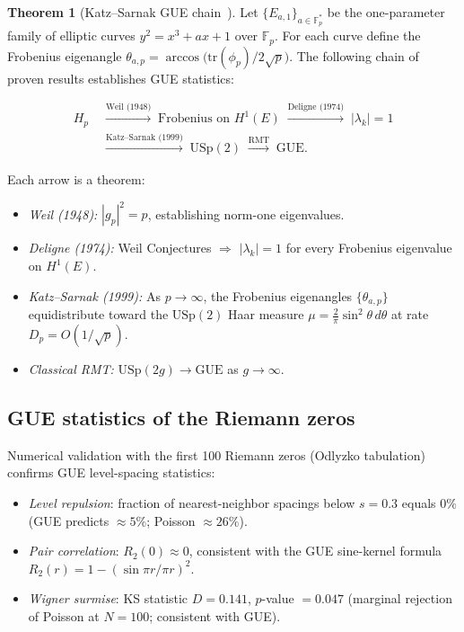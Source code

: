 \documentclass[12pt,oneside]{book}
\theoremstyle{definition}
\newtheorem{theorem}{Theorem}[chapter]
\begin{document}
\begin{theorem}[Katz--Sarnak GUE chain~\cite{KatzSarnak1999,Deligne1974}]
\label{thm:katz-sarnak-chain}
Let $\{E_{a,1}\}_{a \in \mathbb{F}_p^*}$ be the one-parameter family of
elliptic curves $y^2 = x^3 + ax + 1$ over $\mathbb{F}_p$.  For each curve
define the Frobenius eigenangle $\theta_{a,p} = \arccos\!\bigl(\mathrm{tr}(\phi_p)/2\sqrt{p}\bigr)$.
The following chain of proven results establishes GUE statistics:

\begin{align}
  H_p
  &\;\xrightarrow{\text{Weil (1948)}}\;
  \text{Frobenius on } H^1(E)
  \;\xrightarrow{\text{Deligne (1974)}}\;
  |\lambda_k|=1\nonumber\\
  &\;\xrightarrow{\text{Katz--Sarnak (1999)}}\;
  \mathrm{USp}(2)
  \;\xrightarrow{\text{RMT}}\;
  \mathrm{GUE}.
\end{align}

Each arrow is a theorem:
\begin{itemize}
  \item \emph{Weil (1948):} $|g_p|^2 = p$, establishing norm-one eigenvalues.
  \item \emph{Deligne (1974):} Weil Conjectures $\Rightarrow$ $|\lambda_k| = 1$
        for every Frobenius eigenvalue on $H^1(E)$.
  \item \emph{Katz--Sarnak (1999):} As $p \to \infty$, the Frobenius eigenangles
        $\{\theta_{a,p}\}$ equidistribute toward the $\mathrm{USp}(2)$ Haar
        measure $\mu = \tfrac{2}{\pi}\sin^2\!\theta\,d\theta$ at rate
        $D_p = O(1/\sqrt{p})$.
  \item \emph{Classical RMT:} $\mathrm{USp}(2g) \to \mathrm{GUE}$ as $g \to \infty$.
\end{itemize}
\end{theorem}

\subsection{GUE statistics of the Riemann zeros}

Numerical validation with the first 100 Riemann zeros (Odlyzko tabulation)
confirms GUE level-spacing statistics:

\begin{itemize}
  \item \emph{Level repulsion}: fraction of nearest-neighbor spacings below
        $s = 0.3$ equals $0\%$ (GUE predicts $\approx5\%$; Poisson $\approx26\%$).
  \item \emph{Pair correlation}: $R_2(0) \approx 0$, consistent with the
        GUE sine-kernel formula $R_2(r) = 1 - (\sin\pi r / \pi r)^2$.
  \item \emph{Wigner surmise}: KS statistic $D = 0.141$, $p$-value $= 0.047$
        (marginal rejection of Poisson at $N = 100$; consistent with GUE).
\end{itemize}
\end{document}

